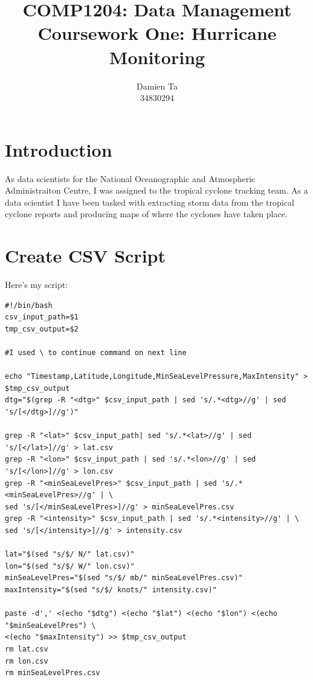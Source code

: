 \documentclass[]{article}
\title{COMP1204: Data Management \\ Coursework One: Hurricane Monitoring }
\author{Damien Ta \\ 34830294}
\begin{document}
\maketitle

\section{Introduction}
As data scientists for the National Oceanographic and Atmospheric Administraiton Centre, I was assigned to the tropical cyclone
tracking team. As a data scientist I have been tasked with extracting storm data from the tropical cyclone reports and producing
maps of where the cyclones have taken place.
\section{Create CSV Script}
Here's my script:
\begin{tcolorbox}[colback=white, colframe=black, boxrule=0.5pt, arc=2mm, 
    title=create\_csv.sh, fonttitle=\bfseries, listing only, listing options={language=sh, basicstyle=\ttfamily}]
    \begin{verbatim}
#!/bin/bash
csv_input_path=$1
tmp_csv_output=$2

#I used \ to continue command on next line

echo "Timestamp,Latitude,Longitude,MinSeaLevelPressure,MaxIntensity" > $tmp_csv_output
dtg="$(grep -R "<dtg>" $csv_input_path | sed 's/.*<dtg>//g' | sed 's/[</dtg>]//g')"

grep -R "<lat>" $csv_input_path| sed 's/.*<lat>//g' | sed 's/[</lat>]//g' > lat.csv
grep -R "<lon>" $csv_input_path | sed 's/.*<lon>//g' | sed 's/[</lon>]//g' > lon.csv
grep -R "<minSeaLevelPres>" $csv_input_path | sed 's/.*<minSeaLevelPres>//g' | \
sed 's/[</minSeaLevelPres>]//g' > minSeaLevelPres.csv
grep -R "<intensity>" $csv_input_path | sed 's/.*<intensity>//g' | \ 
sed 's/[</intensity>]//g' > intensity.csv

lat="$(sed "s/$/ N/" lat.csv)"
lon="$(sed "s/$/ W/" lon.csv)"
minSeaLevelPres="$(sed "s/$/ mb/" minSeaLevelPres.csv)"
maxIntensity="$(sed "s/$/ knots/" intensity.csv)"

paste -d',' <(echo "$dtg") <(echo "$lat") <(echo "$lon") <(echo "$minSeaLevelPres") \
<(echo "$maxIntensity") >> $tmp_csv_output
rm lat.csv
rm lon.csv
rm minSeaLevelPres.csv
    \end{verbatim}
\end{tcolorbox}
\end{document}
